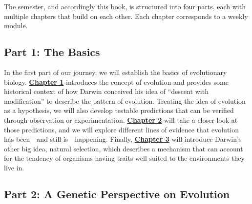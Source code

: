 \documentclass[
]{book}
\begin{document}
The semester, and accordingly this book, is structured into four parts, each with multiple chapters that build on each other. Each chapter corresponds to a weekly module.

\hypertarget{part-1-the-basics}{%
\subsection*{Part 1: The Basics}\label{part-1-the-basics}}

In the first part of our journey, we will establish the basics of evolutionary biology. \href{what-evolution-is.html}{\textbf{Chapter 1}} introduces the concept of evolution and provides some historical context of how Darwin conceived his idea of ``descent with modification'' to describe the pattern of evolution. Treating the idea of evolution as a hypothesis, we will also develop testable predictions that can be verified through observation or experimentation. \href{evidence-for-evolution.html}{\textbf{Chapter 2}} will take a closer look at those predictions, and we will explore different lines of evidence that evolution has been---and still is---happening. Finally, \href{natural-selection-a-mechanism-for-change.html}{\textbf{Chapter 3}} will introduce Darwin's other big idea, natural selection, which describes a mechanism that can account for the tendency of organisms having traits well suited to the environments they live in.

\hypertarget{part-2-a-genetic-perspective-on-evolution}{%
\subsection*{Part 2: A Genetic Perspective on Evolution}\label{part-2-a-genetic-perspective-on-evolution}}
\end{document}
